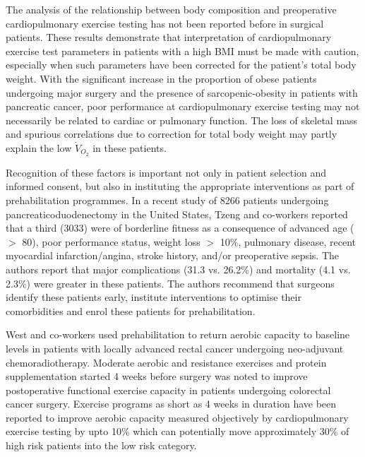 The analysis of the relationship between body composition and preoperative cardiopulmonary exercise testing has not been reported before in surgical patients. 
These results demonstrate that interpretation of cardiopulmonary exercise test parameters in patients with a high BMI must be made with caution, especially when such parameters have been corrected for the patient's total body weight. 
With the significant increase in the proportion of obese patients undergoing major surgery and the presence of sarcopenic-obesity in patients with pancreatic cancer, poor performance at cardiopulmonary exercise testing may not necessarily be related to cardiac or pulmonary function. 
The loss of skeletal mass and spurious correlations due to correction for total body weight may partly explain the low $\dot{V}_{O_2}$ in these patients. 

Recognition of these factors is important not only in patient selection and informed consent, but also in instituting the appropriate interventions as part of prehabilitation programmes. 
In a recent study of 8266 patients undergoing pancreaticoduodenectomy in the United States, Tzeng and co-workers reported that a third (3033) were of borderline fitness as a consequence of advanced age ($>$ 80), poor performance status, weight loss $>$ 10\%, pulmonary disease, recent myocardial infarction/angina, stroke history, and/or preoperative sepsis. 
The authors report that major complications (31.3 vs. 26.2\%) and mortality (4.1 vs. 2.3\%) were greater in these patients.\parencite{tzeng_morbidity_2014} 
The authors recommend that surgeons identify these patients early, institute interventions to optimise their comorbidities and enrol these patients for prehabilitation. 

West and co-workers used prehabilitation to return aerobic capacity to baseline levels in patients with locally advanced rectal cancer undergoing neo-adjuvant chemoradiotherapy.\parencite{west_effect_2015} 
Moderate aerobic and resistance exercises and protein supplementation started 4 weeks before surgery was noted to improve postoperative functional exercise capacity in patients undergoing colorectal cancer surgery.\parencite{gillis_prehabilitation_2014}
Exercise programs as short as 4 weeks in duration have been reported to improve aerobic capacity measured objectively by cardiopulmonary exercise testing by upto 10\% which can potentially move approximately 30\% of high risk patients into the low risk category.\parencite{dunne_pmo-029_2012}

